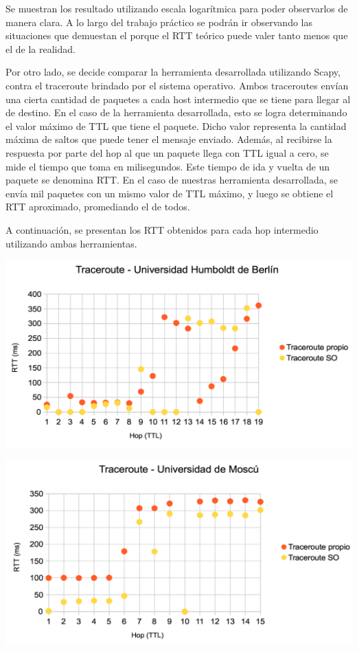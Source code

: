 Se muestran los resultado utilizando escala logarítmica para poder observarlos de manera clara. A lo largo del trabajo práctico se podrán ir observando las situaciones que demuestan el porque el RTT teórico puede valer tanto menos que el de la realidad.

Por otro lado, se decide comparar la herramienta desarrollada utilizando Scapy, contra el traceroute brindado por el sistema operativo. Ambos traceroutes envían una cierta cantidad de paquetes a cada host intermedio que se tiene para llegar al de destino. En el caso de la herramienta desarrollada, esto se logra determinando el valor máximo de TTL que tiene el paquete. Dicho valor representa la cantidad máxima de saltos que puede tener el mensaje enviado. Además, al recibirse la respuesta por parte del hop al que un paquete llega con TTL igual a cero, se mide el tiempo que toma en milisegundos. Este tiempo de ida y vuelta de un paquete se denomina RTT. En el caso de nuestras herramienta desarrollada, se envía mil paquetes con un mismo valor de TTL máximo, y luego se obtiene el RTT aproximado, promediando el de todos. 

A continuación, se presentan los RTT obtenidos para cada hop intermedio utilizando ambas herramientas. 

\centerline{\includegraphics[width=1\textwidth]{imagenes/1ra_parte/Alemania_1ergrafico.png}}

\centerline{\includegraphics[width=1\textwidth]{imagenes/1ra_parte/Rusia_1ergrafico.png}}

